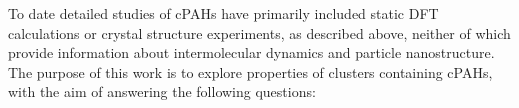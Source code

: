 %

To date detailed studies of cPAHs have primarily included static DFT calculations or crystal structure experiments, as described above, neither of which provide information about intermolecular dynamics and particle nanostructure.
%
%
The purpose of this work is to explore properties of clusters containing cPAHs, with the aim of answering the following questions: 

